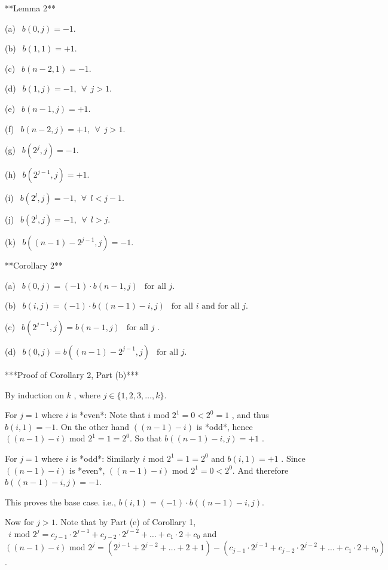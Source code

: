 **Lemma 2**

(a) $ \ \ b(0,j) = -1 $. 

(b) $ \ \ b(1,1) = +1 $.

(c) $ \ \ b(n-2,1) = -1 $.

(d) $ \ \ b(1,j) = -1 ,\ \ \forall\ \ j > 1 $.

(e) $ \ \ b(n-1,j) = +1 $.

(f) $ \ \ b(n-2,j) = +1 ,\ \ \forall\ \ j > 1 $.

(g) $ \ \ b( 2^j , j ) = -1  $.

(h) $ \ \ b( 2^{j-1} , j ) = +1 $. 

(i) $ \ \ b(2^l,j) = -1,\ \ \forall\ \ l < j-1  $.

(j) $  \ \ b(2^l,j) = -1,\ \ \forall\ \ l > j $.

(k) $ \ \ b((n-1)-2^{j-1}, j) = -1 $.



**Corollary 2** 

(a) $ \ \ b(0,j) = (-1) \cdot b(n-1,j)\ \ \text{ for all } j $.  

(b) $ \ \ b(i,j)  = (-1) \cdot b( (n-1)-i , j ) \ \ \text{ for all }  i \text{ and for all  }  j $.  

(c) $ \ \ b( 2^{j-1} , j ) = b(n-1,j)\ \ \text{ for all } j $ . 

(d) $ \ \ b(0,j) = b((n-1)-2^{j-1}, j)\ \ \text{ for all } j $. 

***Proof of Corollary 2, Part (b)***

By induction on  $k$ , where  $j \in \{ 1, 2, 3, \dots , k \} $. 

For  $j = 1$  where  $ i $  is *even*:  Note that  $ i \text{ mod } 2^1  = 0 < 2^0 = 1 $ ,  and thus  $ b(i,1) = -1 $. On the other hand  $ ((n-1)-i)$  is *odd*, hence  $ ((n-1)-i) \text{ mod } 2^1 = 1 = 2^0 $. So that  $ b((n-1)-i, j) = +1 $ . 

For  $j = 1$  where  $ i $  is *odd*:  Similarly  $ i \text{ mod } 2^1  = 1 = 2^0 $ and  $ b(i,1) = +1 $ .  Since  $  ((n-1)-i) $  is *even*,  $ ((n-1)-i) \text{ mod } 2^1 = 0 < 2^0 $. And therefore  $ b((n-1)-i, j) = -1 $. 

This proves the base case. i.e.,  $ b(i,1) = (-1) \cdot b((n-1)-i, j) $. 

Now for  $j > 1$. Note that by Part (e) of Corollary 1,  $\ \ i  \text{ mod } 2^j  = c_{j-1} \cdot 2^{j-1} + c_{j-2} \cdot 2^{j-2} + \dots + c_1 \cdot 2 + c_0  $  and   $ ((n-1)-i) \text{ mod } 2^j = (2^{j-1} + 2^{j-2} + \dots +  2 + 1) - (c_{j-1} \cdot 2^{j-1} + c_{j-2} \cdot 2^{j-2} + \dots + c_1 \cdot 2 + c_0) $. 

